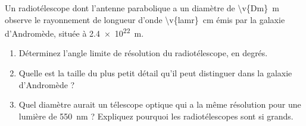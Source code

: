 Un radiotélescope dont l'antenne parabolique a un diamètre de \qty{\v{Dm}}{m} observe le rayonnement de longueur d'onde \qty{\v{lamr}}{cm} émis par la galaxie d'Andromède, située à \qty{2.4e22}{m}.

\begin{enumerate}[label=\alph*)]
    \item Déterminez l'angle limite de résolution du radiotélescope, en degrés.
    \item Quelle est la taille du plus petit détail qu'il peut distinguer dans la galaxie d'Andromède ?
    \item Quel diamètre aurait un télescope optique qui a la même résolution pour une lumière de \qty{550}{nm} ? Expliquez pourquoi les radiotélescopes sont si grands.
\end{enumerate}
